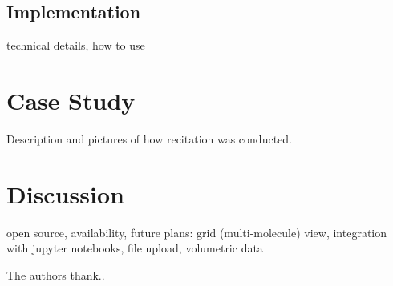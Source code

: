 \documentclass[journal=jceda8,manuscript=article]{achemso}
\begin{document}
\subsection{Implementation}

technical details, how to use

\section{Case Study}

Description and pictures of how recitation was conducted.

\section{Discussion}

open source, availability, future plans: grid (multi-molecule) view, integration with jupyter notebooks, file upload, volumetric data

\begin{acknowledgement}



The authors thank.. 

\end{acknowledgement}



\end{document}
